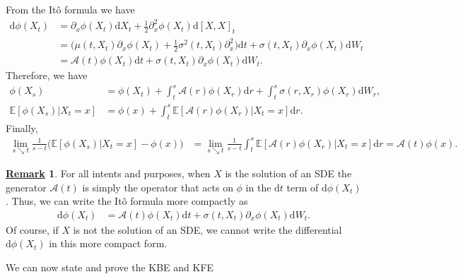 \documentclass[12pt]{book}
\let\varphi\phi
\numberwithin{equation}{chapter}
\theoremstyle{plain}
\numberwithin{theorem}{section}
\theoremstyle{definition}
\newtheorem{remark}[theorem]{\underline{Remark}}
\numberwithin{exercise}{chapter}
\let\oldendproof\endproof
\renewenvironment{proof}[1][\proofname]{%
  \oldproof[\scshape\underline{#1}]%
}{\oldendproof}
\newcommand{\<}{\langle}
\renewcommand{\>}{\rangle}
\renewcommand{\(}{\left(}
\renewcommand{\)}{\right)}
\renewcommand{\[}{\left[}
\renewcommand{\]}{\right]}
\newcommand\Eb{\mathds{E}}
\newcommand\Ac{\mathscr{A}}
\newcommand\sig{\sigma}
\renewcommand\d{\partial}
\newcommand\dd{\mathrm{d}}
\begin{document}
\begin{proof}
From the It\^o formula we have
\begin{align}
\dd \varphi(X_t)
	&=	\d_x \varphi(X_t) \dd X_t + \tfrac{1}{2} \d_x^2 \varphi(X_t) \dd [X,X]_t \\
	&=	\Big( \mu(t,X_t) \d_x \varphi(X_t) + \tfrac{1}{2} \sig^2(t,X_t) \d_x^2 \Big) \dd t + \sig(t,X_t) \d_x \varphi(X_t) \dd W_t \\
	&=	\Ac(t) \varphi(X_t) \dd t + \sig(t,X_t) \d_x \varphi(X_t) \dd W_t .
\end{align}
Therefore, we have
\begin{align}
\varphi(X_s)
	&=	\varphi(X_t) + \int_t^s \Ac(r) \varphi(X_r) \dd r +  \int_t^s \sig(r,X_r) \varphi(X_r) \dd W_r , \\
\Eb [ \varphi(X_s) | X_t = x ]
	&=	\varphi(x) + \int_t^s \Eb[ \Ac(r) \varphi(X_r) | X_t = x ] \dd r .
\end{align}
Finally,
\begin{align}
\lim_{s \searrow t} \frac{1}{s-t}\Big( \Eb[ \varphi(X_s) | X_t = x ] - \varphi(x) \Big) 
	&=	\lim_{s \searrow t} \frac{1}{s-t} \int_t^s \Eb[ \Ac(r) \varphi(X_r) | X_t = x ] \dd r 
	=	\Ac(t) \varphi(x) .
\end{align}
\end{proof}

\begin{remark}
For all intents and purposes, when $X$ is the solution of an SDE the generator $\Ac(t)$ is simply the operator that acts on $\varphi$ in the $\dd t$ term of $\dd \varphi(X_t)$.  Thus, we can write the It\^o formula more compactly as
\begin{align}
\dd \varphi(X_t)
	&=	\Ac(t) \varphi(X_t) \dd t + \sig(t,X_t) \d_x \varphi(X_t) \dd W_t .
\end{align}
Of course, if $X$ is not the solution of an SDE, we cannot write the differential $\dd \varphi(X_t)$ in this more compact form.
\end{remark}

\noindent
We can now state and prove the KBE and KFE
\end{document}
